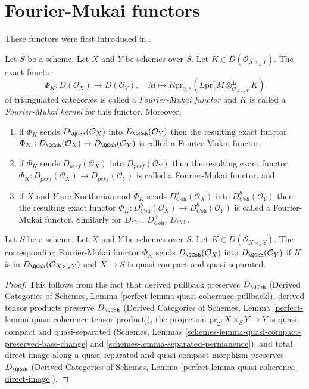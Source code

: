 \section{Fourier-Mukai functors}
\label{section-fourier-mukai}

\noindent
These functors were first introduced in \cite{Mukai}.

\begin{definition}
\label{definition-fourier-mukai-functor}
Let $S$ be a scheme. Let $X$ and $Y$ be schemes over $S$.
Let $K \in D(\mathcal{O}_{X \times_S Y})$. The exact functor
$$
\Phi_K : D(\mathcal{O}_X) \longrightarrow D(\mathcal{O}_Y),\quad
M \longmapsto R\text{pr}_{2, *}(
L\text{pr}_1^*M \otimes_{\mathcal{O}_{X \times_S Y}}^\mathbf{L} K)
$$
of triangulated categories is called a {\it Fourier-Mukai functor}
and $K$ is called a {\it Fourier-Mukai kernel} for this functor.
Moreover,
\begin{enumerate}
\item if $\Phi_K$ sends $D_\QCoh(\mathcal{O}_X)$ into $D_\QCoh(\mathcal{O}_Y)$
then the resulting exact functor
$\Phi_K : D_\QCoh(\mathcal{O}_X) \to D_\QCoh(\mathcal{O}_Y)$
is called a Fourier-Mukai functor,
\item if $\Phi_K$ sends $D_{perf}(\mathcal{O}_X)$ into
$D_{perf}(\mathcal{O}_Y)$ then the resulting exact functor
$\Phi_K : D_{perf}(\mathcal{O}_X) \to D_{perf}(\mathcal{O}_Y)$
is called a Fourier-Mukai functor, and
\item if $X$ and $Y$ are Noetherian and $\Phi_K$ sends
$D^b_{\textit{Coh}}(\mathcal{O}_X)$ into $D^b_{\textit{Coh}}(\mathcal{O}_Y)$
then the resulting exact functor
$\Phi_K : D^b_{\textit{Coh}}(\mathcal{O}_X) \to
D^b_{\textit{Coh}}(\mathcal{O}_Y)$
is called a Fourier-Mukai functor.
Similarly for $D_{\textit{Coh}}$, $D^+_{\textit{Coh}}$, $D^-_{\textit{Coh}}$.
\end{enumerate}
\end{definition}

\begin{lemma}
\label{lemma-fourier-Mukai-QCoh}
Let $S$ be a scheme. Let $X$ and $Y$ be schemes over $S$.
Let $K \in D(\mathcal{O}_{X \times_S Y})$.
The corresponding Fourier-Mukai functor $\Phi_K$ sends
$D_\QCoh(\mathcal{O}_X)$ into $D_\QCoh(\mathcal{O}_Y)$
if $K$ is in $D_\QCoh(\mathcal{O}_{X \times_S Y})$ and $X \to S$ is
quasi-compact and quasi-separated.
\end{lemma}

\begin{proof}
This follows from the fact that derived pullback preserves
$D_\QCoh$
(Derived Categories of Schemes, Lemma
\ref{perfect-lemma-quasi-coherence-pullback}),
derived tensor products preserve $D_\QCoh$
(Derived Categories of Schemes, Lemma
\ref{perfect-lemma-quasi-coherence-tensor-product}),
the projection $\text{pr}_2 : X \times_S Y \to Y$ is
quasi-compact and quasi-separated
(Schemes, Lemmas
\ref{schemes-lemma-quasi-compact-preserved-base-change} and
\ref{schemes-lemma-separated-permanence}), and
total direct image along a quasi-separated and quasi-compact
morphism preserves $D_\QCoh$
(Derived Categories of Schemes, Lemma
\ref{perfect-lemma-quasi-coherence-direct-image}).
\end{proof}

